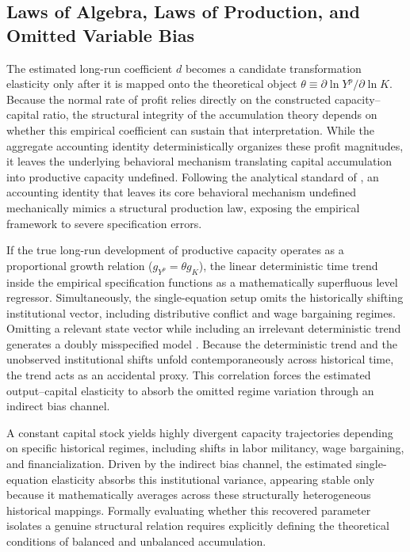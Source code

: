 \documentclass[11pt]{article}
\begin{document}
\subsection{Laws of Algebra, Laws of Production, and Omitted Variable Bias}

The estimated long-run coefficient $d$ becomes a candidate transformation elasticity only after it is mapped onto the theoretical object $\theta \equiv \partial \ln Y^p / \partial \ln K$. Because the normal rate of profit relies directly on the constructed capacity--capital ratio, the structural integrity of the accumulation theory depends on whether this empirical coefficient can sustain that interpretation. While the aggregate accounting identity deterministically organizes these profit magnitudes, it leaves the underlying behavioral mechanism translating capital accumulation into productive capacity undefined. Following the analytical standard of \citet{Shaikh1974}, an accounting identity that leaves its core behavioral mechanism undefined mechanically mimics a structural production law, exposing the empirical framework to severe specification errors.

If the true long-run development of productive capacity operates as a proportional growth relation ($g_{Y^p} = \theta g_K$), the linear deterministic time trend inside the empirical specification functions as a mathematically superfluous level regressor. Simultaneously, the single-equation setup omits the historically shifting institutional vector, including distributive conflict and wage bargaining regimes. Omitting a relevant state vector while including an irrelevant deterministic trend generates a doubly misspecified model \citep{Basu2020}. Because the deterministic trend and the unobserved institutional shifts unfold contemporaneously across historical time, the trend acts as an accidental proxy. This correlation forces the estimated output--capital elasticity to absorb the omitted regime variation through an indirect bias channel.

A constant capital stock yields highly divergent capacity trajectories depending on specific historical regimes, including shifts in labor militancy, wage bargaining, and financialization. Driven by the indirect bias channel, the estimated single-equation elasticity absorbs this institutional variance, appearing stable only because it mathematically averages across these structurally heterogeneous historical mappings. Formally evaluating whether this recovered parameter isolates a genuine structural relation requires explicitly defining the theoretical conditions of balanced and unbalanced accumulation.
\end{document}
